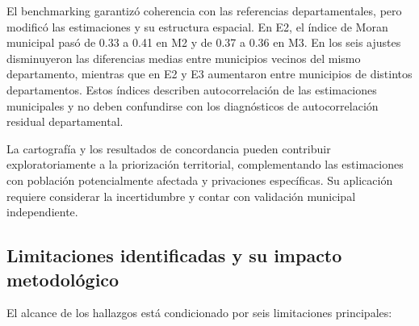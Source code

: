 El benchmarking garantizó coherencia con las referencias departamentales, pero modificó las estimaciones y su estructura espacial. En E2, el índice de Moran municipal pasó de 0.33 a 0.41 en M2 y de 0.37 a 0.36 en M3. En los seis ajustes disminuyeron las diferencias medias entre municipios vecinos del mismo departamento, mientras que en E2 y E3 aumentaron entre municipios de distintos departamentos. Estos índices describen autocorrelación de las estimaciones municipales y no deben confundirse con los diagnósticos de autocorrelación residual departamental.

La cartografía y los resultados de concordancia pueden contribuir exploratoriamente a la priorización territorial, complementando las estimaciones con población potencialmente afectada y privaciones específicas. Su aplicación requiere considerar la incertidumbre y contar con validación municipal independiente.

\subsection{Limitaciones identificadas y su impacto metodológico}
\label{sec:limitaciones}

El alcance de los hallazgos está condicionado por seis limitaciones principales:

